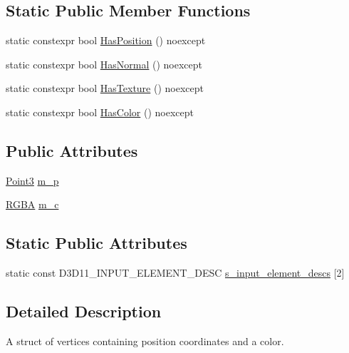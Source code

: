 \subsection*{Static Public Member Functions}
\begin{DoxyCompactItemize}
\item 
static constexpr bool \hyperlink{structmage_1_1rendering_1_1_vertex_position_color_a9a905a75c75030b37575a7b65dff61b0}{Has\+Position} () noexcept
\item 
static constexpr bool \hyperlink{structmage_1_1rendering_1_1_vertex_position_color_a95f2749a6f879b4123034a78c504f3c5}{Has\+Normal} () noexcept
\item 
static constexpr bool \hyperlink{structmage_1_1rendering_1_1_vertex_position_color_a1498641d42122251a8612b7b40d171da}{Has\+Texture} () noexcept
\item 
static constexpr bool \hyperlink{structmage_1_1rendering_1_1_vertex_position_color_aea75d3acadad3cd6da04d0fc2207fc0c}{Has\+Color} () noexcept
\end{DoxyCompactItemize}
\subsection*{Public Attributes}
\begin{DoxyCompactItemize}
\item 
\hyperlink{structmage_1_1_point3}{Point3} \hyperlink{structmage_1_1rendering_1_1_vertex_position_color_a2c1c6a22bff4eca8cee086cc978d008b}{m\+\_\+p}
\item 
\hyperlink{structmage_1_1_r_g_b_a}{R\+G\+BA} \hyperlink{structmage_1_1rendering_1_1_vertex_position_color_a76bd7cc2bbec92bbaf38f72087fdd069}{m\+\_\+c}
\end{DoxyCompactItemize}
\subsection*{Static Public Attributes}
\begin{DoxyCompactItemize}
\item 
static const D3\+D11\+\_\+\+I\+N\+P\+U\+T\+\_\+\+E\+L\+E\+M\+E\+N\+T\+\_\+\+D\+E\+SC \hyperlink{structmage_1_1rendering_1_1_vertex_position_color_a0e9bd3e8e7cad0a5167aaeb76de9fbb3}{s\+\_\+input\+\_\+element\+\_\+descs} \mbox{[}2\mbox{]}
\end{DoxyCompactItemize}


\subsection{Detailed Description}
A struct of vertices containing position coordinates and a color. 

